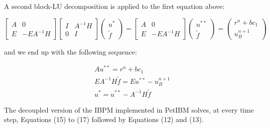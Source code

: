 A second block-LU decomposition is applied to the first equation above:

\begin{equation}
\left[
\begin{matrix}
A & 0 \\
E & -EA^{-1}H
\end{matrix}
\right]
\left[
\begin{matrix}
I & A^{-1}H \\
0 & I
\end{matrix}
\right]
\left(
\begin{matrix}
u^* \\
\tilde{f}
\end{matrix}
\right)
=
\left[
\begin{matrix}
A & 0 \\
E & -EA^{-1}H
\end{matrix}
\right]
\left(
\begin{matrix}
u^{* *} \\
\tilde{f}
\end{matrix}
\right)
=
\left(
\begin{matrix}
r^n + bc_1 \\
u_B^{n+1}
\end{matrix}
\right)
\end{equation}

and we end up with the following sequence:

\begin{align}
& A u^{* *} = r^n + bc_1 \\
& EA^{-1}H \tilde{f} = E u^{* *} - u_B^{n+1} \\
& u^* = u^{* *} - A^{-1}H \tilde{f}
\end{align}

The decoupled version of the IBPM implemented in PetIBM solves, at every time step, Equations (15) to (17) followed by Equations (12) and (13).
